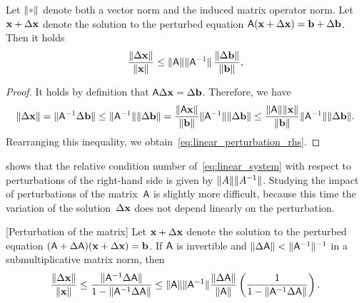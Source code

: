 \begin{proposition}
    \label{proposition:linear_perturbation_rhs}
    Let $\norm{\placeholder}$ denote both a vector norm and the induced matrix operator norm.
    Let $\mathbf x + \Delta \mathbf x$ denote the solution to the perturbed equation $\mathsf A (\mathbf x + \Delta \mathbf x) = \mathbf b + \Delta \mathbf b$.
    Then it holds
    \begin{equation}
        \label{eq:linear_perturbation_rhs}
        \frac{\lVert\Delta \mathbf x\rVert}{\lVert\mathbf x\rVert} \leq \lVert\mathsf A\rVert \lVert\mathsf A^{-1}\rVert \, \frac{\lVert\Delta \mathbf b\rVert}{\lVert\mathbf b\rVert},
    \end{equation}
\end{proposition}
\begin{proof}
    It holds by definition that $\mathsf A \Delta \mathbf x = \Delta \mathbf b$.
    Therefore, we have
    \[
        \lVert\Delta \mathbf x\rVert
        = \lVert\mathsf A^{-1} \Delta \mathbf b\rVert
        \leq \lVert\mathsf A^{-1}\rVert \lVert\Delta \mathbf b\rVert
        = \frac{\lVert\mathsf A \mathbf x\rVert}{\lVert\mathbf b\rVert} \lVert\mathsf A^{-1}\rVert \lVert\Delta \mathbf b\rVert
        \leq \frac{\lVert\mathsf A\rVert \lVert\mathbf x\rVert}{\lVert\mathbf b\rVert} \lVert\mathsf A^{-1}\rVert \lVert\Delta \mathbf b\rVert.
    \]
    Rearranging this inequality,
    we obtain~\eqref{eq:linear_perturbation_rhs}.
\end{proof}
 shows that the relative condition number of~\eqref{eq:linear_system} with respect to perturbations of the right-hand side is given by $\lVert A\rVert \lVert A^{-1}\rVert$.
Studying the impact of perturbations of the matrix~$\mathsf A$ is slightly more difficult,
because this time the variation of the solution~$\Delta \mathbf x$ does not depend linearly on the perturbation.
\begin{proposition}
    \label{proposition:linear_perturbation_matrix}
    [Perturbation of the matrix]
    Let $\mathbf x + \Delta \mathbf x$ denote the solution to the perturbed equation $(\mathsf A + \Delta \mathsf A) (\mathbf x + \Delta \mathbf x) = \mathbf b$.
    If $\mathsf A$ is invertible and $\lVert\Delta \mathsf A\rVert < \lVert\mathsf A^{-1}\rVert^{-1}$ in a submultiplicative matrix norm,
    then
    \begin{equation}
        \label{eq:linear_perturbation_matrix}
        \frac{\lVert\Delta \mathbf x\rVert}{\lVert\mathbf x\rVert}
        \leq \frac{\lVert\mathsf A^{-1} \Delta \mathsf A\rVert}{1 - \lVert\mathsf A^{-1} \Delta \mathsf A\rVert}
        \leq \lVert\mathsf A\rVert \lVert\mathsf A^{-1}\rVert \frac{\lVert\Delta \mathsf A\rVert}{\lVert\mathsf A\rVert}
        \left(\frac{1}{1 - \lVert\mathsf A^{-1} \Delta \mathsf A\rVert} \right).
    \end{equation}
\end{proposition}
